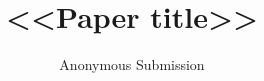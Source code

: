 \documentclass[runningheads]{llncs}   %
\newif\ifanon   \anontrue    %
\begin{document}
\title{<<Paper title>>}
\ifanon
  \author{Anonymous Submission}
  \institute{}
\else
\fi
\maketitle






\ifanon\else
\subsubsection*{Acknowledgements.} <<Acknowledgements (camera-ready only).>>
\fi




% 
\end{document}
